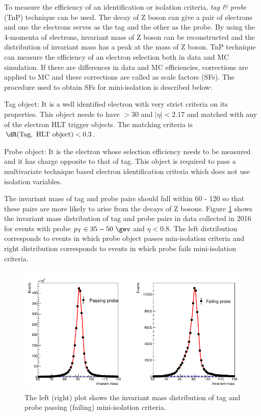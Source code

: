 To measure the efficiency of an identification or isolation criteria, \textit{tag \& probe} (TnP) technique can be used. 
The decay of Z boson can give a pair of electrons and one the electrons serves as the tag and the other as the probe. By using the 
4-momenta of electrons, invariant mass of Z boson can be reconstructed and the distribution of invariant mass has a peak at the mass of Z boson.
TnP technique can measure the efficiency of an electron selection both in data and MC simulation. If there are differences in data and
MC efficiencies, corrections are applied to MC and these corrections are called as scale factors (SFs). The procedure used to obtain SFs 
for mini-isolation is described below:

Tag object: It is a well identified electron with very strict criteria on its properties. This object needs to have \pt 
$>30$ \gev and $|\eta|<2.17$ and matched with any of the electron HLT trigger objects. The matching criteria is $\dR(\mathrm{Tag,\ HLT\ 
object})<0.3$.

Probe object: It is the electron whose selection efficiency needs to be measured and it has charge opposite to that of tag. This object is
required to pass a multivariate technique based electron identification criteria which does not use isolation variables.

The invariant mass of tag and probe pairs should fall within 60 - 120 \gev so that these pairs are more likely to arise from the decays 
of Z bosons. Figure \ref{fig:bin25_el_sc_eta_0p00To0p80_el_pt_35p00To50p00} shows the invariant mass distribution of tag and probe pairs 
in data collected in 2016 for events with probe $\pt \in 35 - 50\ \gev$ and $\eta < 0.8$. The left distribution corresponds to events in 
which probe object passes min-isolation criteria and right distribution corresponds to events in which probe fails mini-isolation criteria. 
\begin{figure}[h!]
\centering
\includegraphics[width=0.9\linewidth]{../Figures/Chap2/bin25_el_sc_eta_0p00To0p80_el_pt_35p00To50p00.pdf}
\captionsetup{width=.9\linewidth}
\caption[TnP fit for MiniIso pass/fail]{The left (right) plot shows the invariant mass distribution of tag and probe passing (failing) 
mini-isolation criteria.}
\label{fig:bin25_el_sc_eta_0p00To0p80_el_pt_35p00To50p00}
\end{figure}

